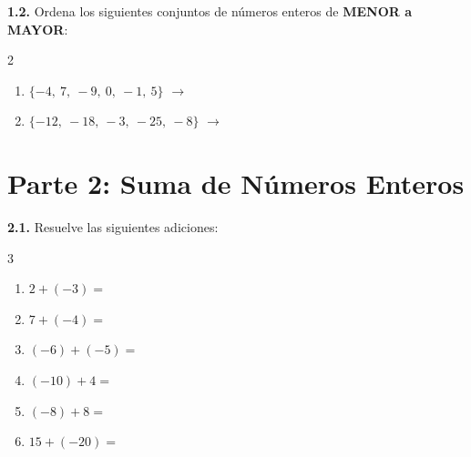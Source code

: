 \documentclass[11pt, letterpaper]{article}
\newif\ifshowanswers
\newcommand{\answer}[1]{
	\ifshowanswers
	\par\vspace{0.1cm}
	\begin{tcolorbox}[colback=blue!5!white, colframe=blue!60!white, arc=1mm, boxrule=0.5pt, title=\textbf{\footnotesize SOLUCIÓN PASO A PASO (DOCENTE)}]
		\color{blue!80!black}\footnotesize #1
	\end{tcolorbox}
	\par\vspace{0.1cm}
	\else
	\par\vspace{0.2cm}
	\fi
}
\begin{document}
	\noindent \textbf{1.2.} Ordena los siguientes conjuntos de números enteros de \textbf{MENOR a MAYOR}:
	\begin{multicols}{2}
		\begin{enumerate}[label=\alph*), itemsep=0.1cm]
			\item $\{ -4, \ 7, \ -9, \ 0, \ -1, \ 5 \}$ $\rightarrow$ \underline{\hspace{3.5cm}}
			\item $\{ -12, \ -18, \ -3, \ -25, \ -8 \}$ $\rightarrow$ \underline{\hspace{3.5cm}}
		\end{enumerate}
	\end{multicols}
	
	\answer{
		a) $-9, \ -4, \ -1, \ 0, \ 5, \ 7$ \quad 
		b) $-25, \ -18, \ -12, \ -8, \ -3$
	}
	
	\section*{\color{valblue} Parte 2: Suma de Números Enteros}
	
	\noindent \textbf{2.1.} Resuelve las siguientes adiciones:
	\begin{multicols}{3}
		\begin{enumerate}[label=\alph*), itemsep=0.1cm]
			\item $2 + (-3) = $ \underline{\hspace{1cm}}
			\item $7 + (-4) = $ \underline{\hspace{1cm}}
			\item $(-6) + (-5) = $ \underline{\hspace{1cm}}
			\item $(-10) + 4 = $ \underline{\hspace{1cm}}
			\item $(-8) + 8 = $ \underline{\hspace{1cm}}
			\item $15 + (-20) = $ \underline{\hspace{1cm}}
		\end{enumerate}
	\end{multicols}
	
	\answer{
		a) $-1$ \quad b) $3$ \quad c) $-11$ \quad d) $-6$ \quad e) $0$ \quad f) $-5$
	}
	
\end{document}
